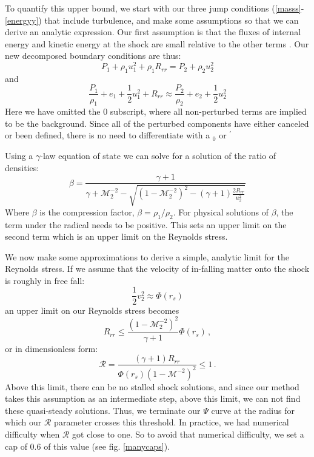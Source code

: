\documentclass[twocolumn]{aastex6}
\begin{document}
To quantify this upper bound, we start with our three jump conditions
(\ref{masss}-\ref{energyy}) that include
turbulence, and make some assumptions so that we can derive
  an analytic expression. Our first assumption is that the fluxes of internal energy and kinetic energy at the shock are small relative to the other terms \citep{meakin07b,meakin10,murphy11b}. Our new decomposed boundary conditions are thus:
\begin{equation}
  P_1+\rho_1u_1^2+\rho_1R_{rr} = P_2 + \rho_2u_2^2
\end{equation}
and
\begin{equation}
  \frac{P_1}{\rho_1} + e_1 + \frac{1}{2}u_1^2 + R_{rr} \approx \frac{P_2}{\rho_2} + e_2 + \frac{1}{2}u_2^2
\end{equation}
Here we have omitted the 0 subscript, where all non-perturbed terms are implied to be the background. Since all of the perturbed components have either canceled or been defined, there is no need to differentiate with a $_0$ or $^\prime$

Using a $\gamma$-law equation of state we can solve for a solution of the ratio of densities:
\begin{equation}
 \beta = \frac{\gamma + 1}{\gamma + \mathcal{M}_2^{-2} - \sqrt{(1-\mathcal{M}_2^{-2})^2 - (\gamma+1)\frac{2R_{rr}}{u_2^2}}}
\end{equation}
Where $\beta$ is the compression factor, $\beta = \rho_1/\rho_2$. For physical solutions of $\beta$, the term under the radical needs to be positive. This sets an upper limit on the second term which is an upper limit on the Reynolds stress.  

We now make some approximations to derive a simple, analytic limit for the Reynolds stress. If we assume that the velocity of in-falling matter onto the shock is roughly in free fall:
\begin{equation}
  \frac{1}{2}v_2^2 \approx \Phi(r_s)
\end{equation}
an upper limit on our Reynolds stress becomes
\begin{equation}
  R_{rr} \leq \frac{(1-\mathcal{M}_2^{-2})^2}{\gamma + 1}\Phi(r_s) \, ,
  \label{Rrr}
\end{equation}
or in dimensionless form:
\begin{equation}
  \mathcal{R} = \frac{(\gamma+1)R_{rr}}{\Phi(r_s) (1-\mathcal{M}^{-2})^2} \leq 1 \, .
  \label{Rcapeq}
\end{equation}
Above this limit, there can be no stalled shock solutions, and since our method takes this assumption as an intermediate step, above this limit, we can not find these quasi-steady solutions. Thus, we terminate our $\Psi$ curve at the radius for which our $\mathcal{R}$ parameter crosses this threshold. In practice, we had numerical difficulty when $\mathcal{R}$ got close to one. So to avoid that numerical difficulty, we set a cap of 0.6 of this value (see fig. \ref{manycaps}). 
\end{document}

